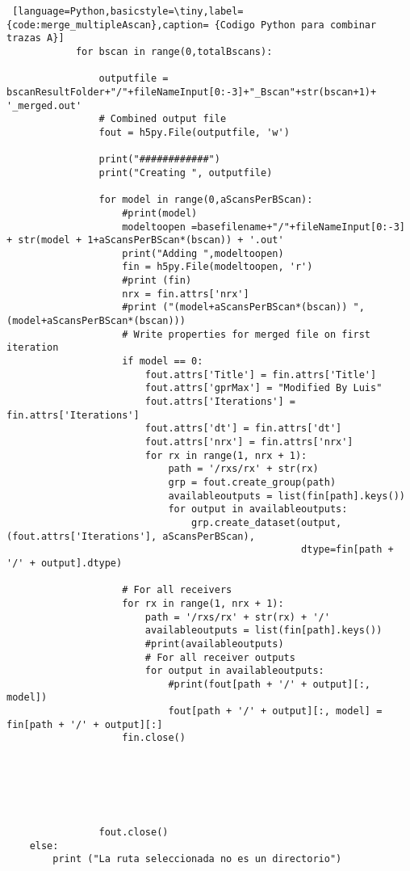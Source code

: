 \begin{lstlisting} [language=Python,basicstyle=\tiny,label={code:merge_multipleAscan},caption= {Codigo Python para combinar trazas A}]
            for bscan in range(0,totalBscans):

                outputfile = bscanResultFolder+"/"+fileNameInput[0:-3]+"_Bscan"+str(bscan+1)+ '_merged.out'
                # Combined output file
                fout = h5py.File(outputfile, 'w')

                print("############")
                print("Creating ", outputfile)

                for model in range(0,aScansPerBScan):
                    #print(model)
                    modeltoopen =basefilename+"/"+fileNameInput[0:-3] + str(model + 1+aScansPerBScan*(bscan)) + '.out'
                    print("Adding ",modeltoopen)
                    fin = h5py.File(modeltoopen, 'r')
                    #print (fin)
                    nrx = fin.attrs['nrx']
                    #print ("(model+aScansPerBScan*(bscan)) ",(model+aScansPerBScan*(bscan)))
                    # Write properties for merged file on first iteration
                    if model == 0:
                        fout.attrs['Title'] = fin.attrs['Title']
                        fout.attrs['gprMax'] = "Modified By Luis"
                        fout.attrs['Iterations'] = fin.attrs['Iterations']
                        fout.attrs['dt'] = fin.attrs['dt']
                        fout.attrs['nrx'] = fin.attrs['nrx']
                        for rx in range(1, nrx + 1):
                            path = '/rxs/rx' + str(rx)
                            grp = fout.create_group(path)
                            availableoutputs = list(fin[path].keys())
                            for output in availableoutputs:
                                grp.create_dataset(output, (fout.attrs['Iterations'], aScansPerBScan),
                                                   dtype=fin[path + '/' + output].dtype)

                    # For all receivers
                    for rx in range(1, nrx + 1):
                        path = '/rxs/rx' + str(rx) + '/'
                        availableoutputs = list(fin[path].keys())
                        #print(availableoutputs)
                        # For all receiver outputs
                        for output in availableoutputs:
                            #print(fout[path + '/' + output][:, model])
                            fout[path + '/' + output][:, model] = fin[path + '/' + output][:]
                    fin.close()






                fout.close()
    else:
        print ("La ruta seleccionada no es un directorio")


\end{lstlisting}
